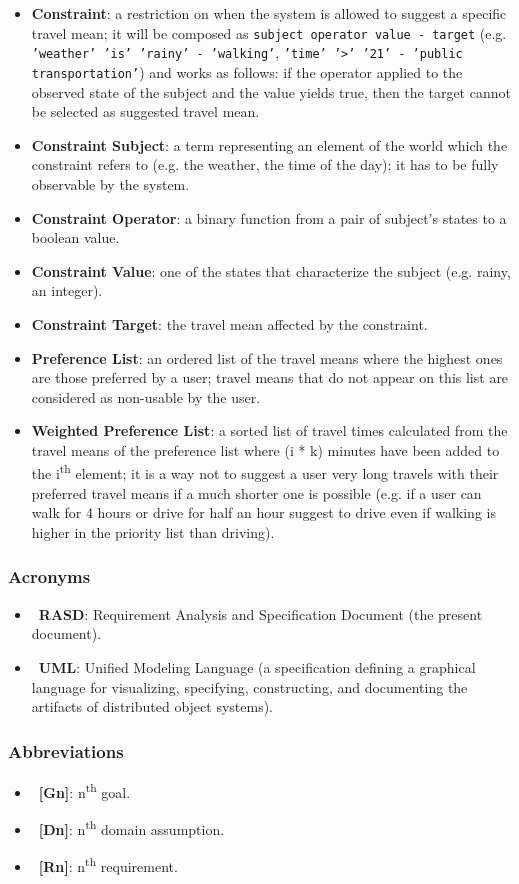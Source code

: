 \begin{itemize}
\item \textbf{Constraint}: a restriction on when the system is allowed to suggest a specific travel mean; it will be composed as \texttt{subject operator value - target} (e.g. \texttt{'weather' 'is' 'rainy' - 'walking'}, \texttt{'time' '>' '21' - 'public transportation'}) and works as follows: if the operator applied to the observed state of the subject and the value yields true, then the target cannot be selected as suggested travel mean.
\item \textbf{Constraint Subject}: a term representing an element of the world which the constraint refers to (e.g. the weather, the time of the day); it has to be fully observable by the system.
\item \textbf{Constraint Operator}: a binary function from a pair of subject's states to a boolean value.
\item \textbf{Constraint Value}: one of the states that characterize the subject (e.g. rainy, an integer).
\item \textbf{Constraint Target}: the travel mean affected by the constraint.

\item \textbf{Preference List}: an ordered list of the travel means where the highest ones are those preferred by a user; travel means that do not appear on this list are considered as non-usable by the user.
\item \textbf{Weighted Preference List}: a sorted list of travel times calculated from the travel means of the preference list where (i * k) minutes have been added to the i\textsuperscript{th} element; it is a way not to suggest a user very long travels with their preferred travel means if a much shorter one is possible (e.g. if a user can walk for 4 hours or drive for half an hour suggest to drive even if walking is higher in the priority list than driving).
\end{itemize}

\subsubsection{Acronyms}

\begin{itemize}
\item~\textbf{RASD}: Requirement Analysis and Specification Document (the present document).
\item~\textbf{UML}: Unified Modeling Language (a specification defining a graphical language for visualizing, specifying, constructing, and documenting the artifacts of distributed object systems).
 
\end{itemize}

\subsubsection{Abbreviations}

\begin{itemize}
\item~\textbf{[Gn]}: n\textsuperscript{th} goal.
\item~\textbf{[Dn]}: n\textsuperscript{th} domain assumption.
\item~\textbf{[Rn]}: n\textsuperscript{th} requirement.
\end{itemize}